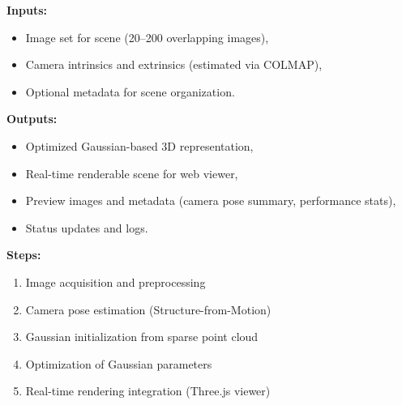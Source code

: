 \textbf{Inputs:}
\begin{itemize}
  \item Image set for scene (20–200 overlapping images),
  \item Camera intrinsics and extrinsics (estimated via COLMAP),
  \item Optional metadata for scene organization.
\end{itemize}

\textbf{Outputs:}
\begin{itemize}
  \item Optimized Gaussian-based 3D representation,
  \item Real-time renderable scene for web viewer,
  \item Preview images and metadata (camera pose summary, performance stats),
  \item Status updates and logs.
\end{itemize}

\textbf{Steps:}
\begin{enumerate}
  \item Image acquisition and preprocessing
  \item Camera pose estimation (Structure-from-Motion)
  \item Gaussian initialization from sparse point cloud
  \item Optimization of Gaussian parameters
  \item Real-time rendering integration (Three.js viewer)
\end{enumerate}
